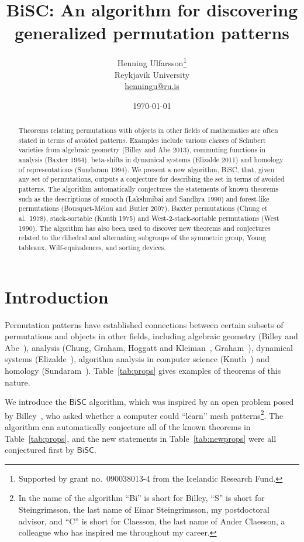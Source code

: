 \documentclass[a4paper]{article}
\title{BiSC: An algorithm for discovering generalized permutation patterns}
\author{Henning Ulfarsson\thanks{Supported by grant no.\ 090038013-4 from the Icelandic Research Fund.}\\
Reykjavik University\\
\href{mailto:henningu@ru.is}{henningu@ru.is}
}
\date{\today}
\newcommand{\bisc}{\mathsf{BiSC}}
\begin{document}
\maketitle

\begin{abstract}
  Theorems relating permutations with objects in other fields of mathematics are
  often stated in terms of avoided patterns. Examples include various classes of
  Schubert varieties from algebraic geometry (Billey and Abe 2013), commuting
  functions in analysis (Baxter 1964), beta-shifts in dynamical systems (Elizalde
  2011) and homology of representations (Sundaram 1994). We present a new
  algorithm, BiSC, that, given any set of permutations, outputs a conjecture
  for describing the set in terms of avoided patterns. The algorithm automatically conjectures the statements of known theorems
  such as the descriptions of smooth (Lakshmibai and Sandhya 1990) and
  forest-like permutations (Bousquet-M{\'e}lou and Butler 2007), Baxter
  permutations (Chung et al.\ 1978), stack-sortable (Knuth 1975) and
  West-2-stack-sortable permutations (West 1990). The algorithm has also been
  used to discover new theorems and conjectures related to the dihedral and alternating subgroups
  of the symmetric group, Young tableaux, Wilf-equivalences, and sorting devices.

\end{abstract}

\section{Introduction}
\label{sec:in}

Permutation patterns have established connections between certain subsets of
permutations and objects in other fields, including algebraic
geometry (Billey and Abe~\cite{BH}), analysis (Chung, Graham, Hoggatt and Kleiman~\cite{Baxter}, Graham~\cite{BaxterOLD}), dynamical
systems (Elizalde~\cite{beta}), algorithm analysis in computer science (Knuth~\cite{K}) and homology (Sundaram~\cite{Sun}).
Table~\ref{tab:props} gives examples of theorems of this nature.

We introduce the $\bisc$ algorithm, which was inspired by
an open problem posed by Billey~\cite{SaraTalk}, who asked whether a computer
could ``learn'' mesh patterns\footnote{In the name of the algorithm ``Bi'' is short for Billey, ``S'' is short for
Steingrimsson, the last name of Einar Steingrimsson, my postdoctoral advisor, and ``C'' is short for Claesson, the last name
of Ander Claesson, a colleague who has inspired me throughout my career.}. The algorithm can automatically conjecture all
of the known theorems in Table~\ref{tab:props}, and the new statements in
Table~\ref{tab:newprops} were all conjectured first by $\bisc$.
\end{document}
